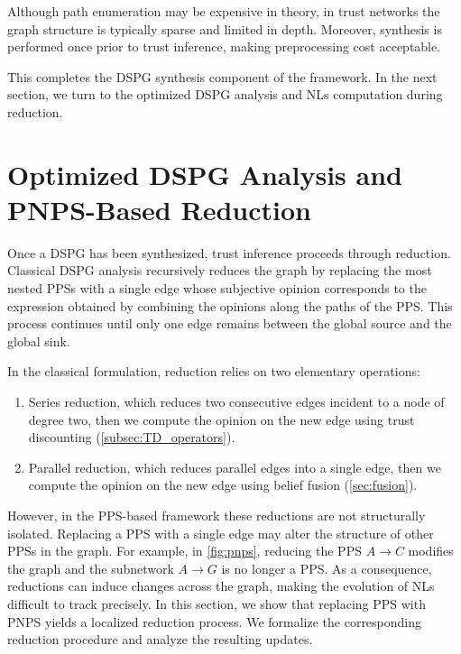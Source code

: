 Although path enumeration may be expensive in theory, in trust networks the graph structure is typically sparse and limited in depth. Moreover, synthesis is performed once prior to trust inference, making preprocessing cost acceptable.


This completes the \ac{DSPG} synthesis component of the framework. In the next section, we turn to the optimized \ac{DSPG} analysis and \acp{NL} computation during reduction.
\section{Optimized \acs{DSPG} Analysis and \acs{PNPS}-Based Reduction}
\label{sec:optimized_analysis}
Once a \ac{DSPG} has been synthesized, trust inference proceeds through reduction. Classical \ac{DSPG} analysis recursively reduces the graph by replacing the most nested \acp{PPS} with a single edge whose subjective opinion corresponds to the expression obtained by combining the opinions along the paths of the \ac{PPS}. This process continues until only one edge remains between the global source and the global sink.

In the classical formulation, reduction relies on two elementary operations:
\begin{enumerate}
    \item Series reduction, which reduces two consecutive edges incident to a node of degree two, then we compute the opinion on the new edge using trust discounting (\cref{subsec:TD_operators}).
    \item Parallel reduction, which reduces parallel edges into a single edge, then we compute the opinion on the new edge using belief fusion (\cref{sec:fusion}).
\end{enumerate}

However, in the \ac{PPS}-based framework these reductions are not structurally isolated. Replacing a \ac{PPS} with a single edge may alter the structure of other \acp{PPS} in the graph. For example, in \cref{fig:pnps}, reducing the \ac{PPS} \(A \to C\) modifies the graph and the subnetwork \(A \to G\) is no longer a \ac{PPS}. As a consequence, reductions can induce changes across the graph, making the evolution of \acp{NL} difficult to track precisely. In this section, we show that replacing \ac{PPS} with \ac{PNPS} yields a localized reduction process. We formalize the corresponding reduction procedure and analyze the resulting  updates.

